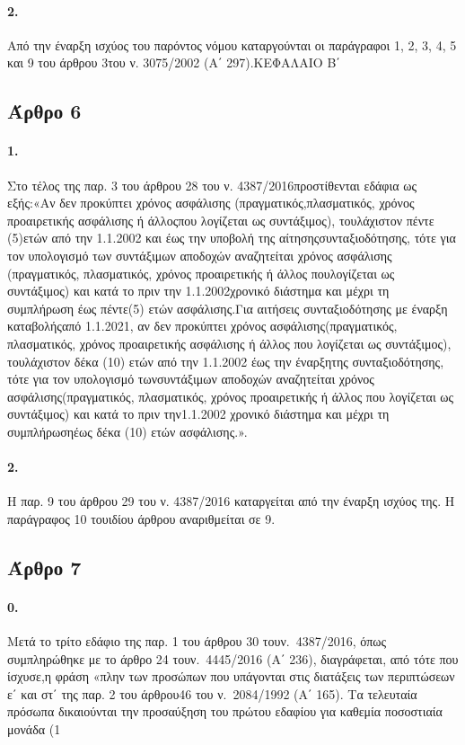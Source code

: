 \documentclass[a4paper,oneside, 10pt]{book}
\begin{document}
\paragraph { 2. } Από την έναρξη ισχύος του παρόντος νόμου καταργούνται οι παράγραφοι 1, 2, 3, 4, 5 και 9 του άρθρου 3του ν. 3075/2002 (Α΄ 297).ΚΕΦΑΛΑΙΟ Β΄
\subsection*{ Άρθρο 6 }
\paragraph { 1. } Στο τέλος της παρ. 3 του άρθρου 28 του ν. 4387/2016προστίθενται εδάφια ως εξής:«Αν δεν προκύπτει χρόνος ασφάλισης (πραγματικός,πλασματικός, χρόνος προαιρετικής ασφάλισης ή άλλοςπου λογίζεται ως συντάξιμος), τουλάχιστον πέντε (5)ετών από την 1.1.2002 και έως την υποβολή της αίτησηςσυνταξιοδότησης, τότε για τον υπολογισμό των συντάξιμων αποδοχών αναζητείται χρόνος ασφάλισης (πραγματικός, πλασματικός, χρόνος προαιρετικής ή άλλος πουλογίζεται ως συντάξιμος) και κατά το πριν την 1.1.2002χρονικό διάστημα και μέχρι τη συμπλήρωση έως πέντε(5) ετών ασφάλισης.Για αιτήσεις συνταξιοδότησης με έναρξη καταβολήςαπό 1.1.2021, αν δεν προκύπτει χρόνος ασφάλισης(πραγματικός, πλασματικός, χρόνος προαιρετικής ασφάλισης ή άλλος που λογίζεται ως συντάξιμος), τουλάχιστον δέκα (10) ετών από την 1.1.2002 έως την έναρξητης συνταξιοδότησης, τότε για τον υπολογισμό τωνσυντάξιμων αποδοχών αναζητείται χρόνος ασφάλισης(πραγματικός, πλασματικός, χρόνος προαιρετικής ή άλλος που λογίζεται ως συντάξιμος) και κατά το πριν την1.1.2002 χρονικό διάστημα και μέχρι τη συμπλήρωσηέως δέκα (10) ετών ασφάλισης.».
\paragraph { 2. } Η παρ. 9 του άρθρου 29 του ν. 4387/2016 καταργείται από την έναρξη ισχύος της. Η παράγραφος 10 τουιδίου άρθρου αναριθμείται σε 9.
\subsection*{ Άρθρο 7 }
\paragraph { 0. } Μετά το τρίτο εδάφιο της παρ. 1 του άρθρου 30 τουν. 4387/2016, όπως συμπληρώθηκε με το άρθρο 24 τουν. 4445/2016 (Α΄ 236), διαγράφεται, από τότε που ίσχυσε,η φράση «πλην των προσώπων που υπάγονται στις διατάξεις των περιπτώσεων ε΄ και στ΄ της παρ. 2 του άρθρου46 του ν. 2084/1992 (Α΄ 165). Τα τελευταία πρόσωπα δικαιούνται την προσαύξηση του πρώτου εδαφίου για καθεμία ποσοστιαία μονάδα (1%
\end{document}
